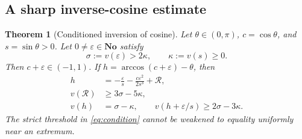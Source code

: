 \documentclass[11pt,letterpaper]{article}
\newtheorem{theorem}{Theorem}[section]
\theoremstyle{definition}
\theoremstyle{remark}
\newcommand{\No}{\mathbf{No}}
\numberwithin{equation}{section}
\begin{document}
\subsection{A sharp inverse-cosine estimate}
\begin{theorem}[Conditioned inversion of cosine]\label{thm:conditioned}
Let $\theta\in(0,\pi)$, $c=\cos\theta$, and $s=\sin\theta>0$. Let $0\ne\varepsilon\in\No$ satisfy
\begin{equation}\label{eq:condition}
 \sigma:=v(\varepsilon)>2\kappa,
 \qquad \kappa:=v(s)\ge0.
\end{equation}
Then $c+\varepsilon\in(-1,1)$. If
$h=\arccos(c+\varepsilon)-\theta$, then
\begin{align}\label{eq:inversecos}
 h&=-\frac\varepsilon s-\frac{c\varepsilon^2}{2s^3}+\mathcal R,\\
 v(\mathcal R)&\ge3\sigma-5\kappa,\nonumber\\
 v(h)&=\sigma-\kappa,\qquad
 v(h+\varepsilon/s)\ge2\sigma-3\kappa.\nonumber
\end{align}
The strict threshold in \eqref{eq:condition} cannot be weakened to equality uniformly near an extremum.
\end{theorem}
\end{document}
